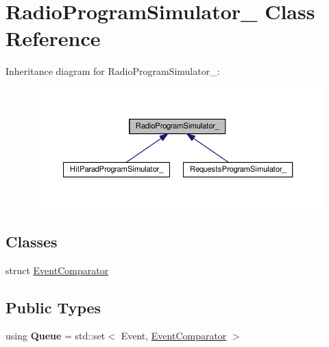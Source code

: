 \hypertarget{class_radio_program_simulator__}{}\section{Radio\+Program\+Simulator\+\_\+ Class Reference}
\label{class_radio_program_simulator__}


Inheritance diagram for Radio\+Program\+Simulator\+\_\+\+:
\nopagebreak
\begin{figure}[H]
\begin{center}
\leavevmode
\includegraphics[width=350pt]{class_radio_program_simulator____inherit__graph}
\end{center}
\end{figure}
\subsection*{Classes}
\begin{DoxyCompactItemize}
\item 
struct \hyperlink{struct_radio_program_simulator___1_1_event_comparator}{Event\+Comparator}
\end{DoxyCompactItemize}
\subsection*{Public Types}
\begin{DoxyCompactItemize}
\item 
using {\bfseries Queue} = std\+::set$<$ Event, \hyperlink{struct_radio_program_simulator___1_1_event_comparator}{Event\+Comparator} $>$\hypertarget{class_radio_program_simulator___ac98d8550782603c086c78a7e0cffaa25}{}\label{class_radio_program_simulator___ac98d8550782603c086c78a7e0cffaa25}

\end{DoxyCompactItemize}
